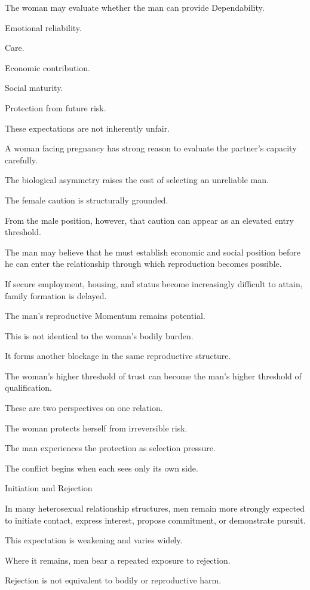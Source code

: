 The woman may evaluate whether the man can provide Dependability.

Emotional reliability.

Care.

Economic contribution.

Social maturity.

Protection from future risk.

These expectations are not inherently unfair.

A woman facing pregnancy has strong reason to evaluate the partner’s capacity carefully.

The biological asymmetry raises the cost of selecting an unreliable man.

The female caution is structurally grounded.

From the male position, however, that caution can appear as an elevated entry threshold.

The man may believe that he must establish economic and social position before he can enter the relationship through which reproduction becomes possible.

If secure employment, housing, and status become increasingly difficult to attain, family formation is delayed.

The man’s reproductive Momentum remains potential.

This is not identical to the woman’s bodily burden.

It forms another blockage in the same reproductive structure.

The woman’s higher threshold of trust can become the man’s higher threshold of qualification.

These are two perspectives on one relation.

The woman protects herself from irreversible risk.

The man experiences the protection as selection pressure.

The conflict begins when each sees only its own side.

Initiation and Rejection

In many heterosexual relationship structures, men remain more strongly expected to initiate contact, express interest, propose commitment, or demonstrate pursuit.

This expectation is weakening and varies widely.

Where it remains, men bear a repeated exposure to rejection.

Rejection is not equivalent to bodily or reproductive harm.


